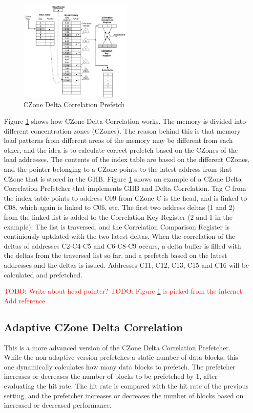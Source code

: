 \documentclass[a4paper]{IEEEtran}
\newcommand\TODO[1]{\textcolor{red}{TODO:#1}}
\newcommand\todo[1]{\TODO{#1}}
\begin{document}
\begin{figure}[h!]
  \centering
      \includegraphics[width=0.5\textwidth]{Figures/CDC}
  \caption{CZone Delta Correlation Prefetch}
  \label{fig:CDC}
\end{figure}

Figure \ref{fig:CDC}\cite{ghb} shows how CZone Delta Correlation works. 
The memory is divided into different concentration zones (CZones). 
The reason behind this is that memory load patterns from different areas of the memory may be different from each other, and the idea is to calculate correct prefetch based on the CZones of the load addresses.
The contents of the index table are based on the different CZones, and the pointer belonging to a CZone points to the latest address from that CZone that is stored in the GHB.
Figure \ref{fig:CDC} shows an example of a CZone Delta Correlation Prefetcher that implements GHB and Delta Correlation. 
Tag C from the index table points to address C09 from CZone C is the head, and is linked to C08,  which again is linked to C06, etc. 
The first two address deltas (1 and 2) from the linked list is added to the Correlation Key Register (2 and 1 in the example). 
The list is traversed, and the Correlation Comparison Register is continiously uptdated with the two latest deltas. 
When the correlation of the deltas of addresses C2-C4-C5 and C6-C8-C9  occurs, a delta buffer is filled with the deltas from the traversed list so far, and a prefetch based on the latest addresses and the deltas is issued.
Addresses C11, C12, C13, C15 and C16 will be calculated and prefetched.
 
\todo{ Write about head pointer?} \break
\todo{ Figure \ref{fig:CDC} is picked from the internet. Add reference }

\subsection{Adaptive CZone Delta Correlation}
This is a more advanced version of the CZone Delta Correlation Prefetcher.
While the non-adaptive version prefetches a static number of data blocks, this one dynamically calculates how many data blocks to prefetch.
The prefetcher increases or decreases the number of blocks to be prefetched by 1, after evaluating the hit rate.
The hit rate is compared with the hit rate of the previous setting, and the prefetcher increases or decreases the number of blocks based on increased or decreased performance. 
\end{document}
